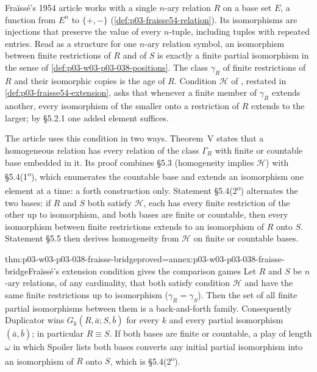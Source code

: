 Fra\"iss\'e's 1954 article works with a single \(n\)-ary relation \(R\)
on a base set \(E\), a function from \(E^n\) to \(\{+,-\}\)
(\cref{def:p03-fraisse54-relation}). Its isomorphisms are injections that
preserve the value of every \(n\)-tuple, including tuples with repeated
entries. Read as a structure for one \(n\)-ary relation symbol, an
isomorphism between finite restrictions of \(R\) and of \(S\) is exactly a
finite partial isomorphism in the sense of
\cref{def:p03-w03-p03-038-positions}. The class \(\gamma_R\) of finite
restrictions of \(R\) and their isomorphic copies is the age of \(R\).
Condition \(\mathcal H\) of \cite[\S5.2, p.~377]{Fraisse1954}, restated in
\cref{def:p03-fraisse54-extension}, asks that whenever a finite member of
\(\gamma_R\) extends another, every isomorphism of the smaller onto a
restriction of \(R\) extends to the larger; by \S5.2.1 one added element
suffices.

The article uses this condition in two ways. Theorem~V
\cite[\S5.1, p.~377]{Fraisse1954} states that a homogeneous relation has
every relation of the class \(\Gamma_R\) with finite or countable base
embedded in it. Its proof combines \S5.3 (homogeneity implies
\(\mathcal H\)) with \S5.4(1\textsuperscript{o}), which enumerates the
countable base and extends an isomorphism one element at a time: a forth
construction only. Statement \S5.4(2\textsuperscript{o})
\cite[pp.~378--379]{Fraisse1954} alternates the two bases: if \(R\) and
\(S\) both satisfy \(\mathcal H\), each has every finite restriction of the
other up to isomorphism, and both bases are finite or countable, then
every isomorphism between finite restrictions extends to an isomorphism of
\(R\) onto \(S\). Statement \S5.5 then derives homogeneity from
\(\mathcal H\) on finite or countable bases.

\begin{hbtheorem}{thm:p03-w03-p03-038-fraisse-bridge}{proved=annex:p03-w03-p03-038-fraisse-bridge}{Fra\"iss\'e's extension condition gives the comparison games}
Let \(R\) and \(S\) be \(n\)-ary relations, of any cardinality, that both
satisfy condition \(\mathcal H\) and have the same finite restrictions up
to isomorphism (\(\gamma_R=\gamma_S\)). Then the set of all finite partial
isomorphisms between them is a back-and-forth family. Consequently
Duplicator wins \(G_k(R,\bar a;S,\bar b)\) for every \(k\) and every
partial isomorphism \((\bar a,\bar b)\); in particular \(R\equiv S\). If
both bases are finite or countable, a play of length \(\omega\) in which
Spoiler lists both bases converts any initial partial isomorphism into an
isomorphism of \(R\) onto \(S\), which is \S5.4(2\textsuperscript{o}).
\end{hbtheorem}

